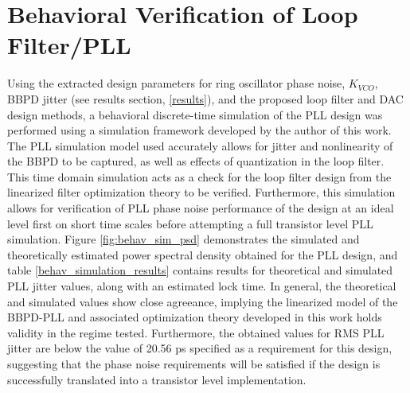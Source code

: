 
	\FloatBarrier

	\section{Behavioral Verification of Loop Filter/PLL}\label{behav_sim}

		Using the extracted design parameters for ring oscillator phase noise, $K_{VCO}$, BBPD jitter (see results section, \ref{results}), and the proposed loop filter and DAC design methods, a behavioral discrete-time simulation of the PLL design was performed using a simulation framework \cite{Me} developed by the author of this work. The PLL simulation model used accurately allows for jitter and nonlinearity of the BBPD to be captured, as well as effects of quantization in the loop filter.  This time domain simulation acts as a check for the loop filter design from the linearized filter optimization theory to be verified. Furthermore, this simulation allows for verification of PLL phase noise performance of the design at an ideal level first on short time scales before attempting a full transistor level PLL simulation. Figure \ref{fig:behav_sim_psd} demonstrates the simulated and theoretically estimated power spectral density obtained for the PLL design, and table \ref{behav_simulation_results} contains results for theoretical and simulated PLL jitter values, along with an estimated lock time. In general, the theoretical and simulated values show close agreeance, implying the linearized model of the BBPD-PLL and associated optimization theory developed in this work holds validity in the regime tested. Furthermore, the obtained values for RMS PLL jitter are below the value of 20.56 ps specified as a requirement for this design, suggesting that the phase noise requirements will be satisfied if the design is successfully translated into a transistor level implementation.



